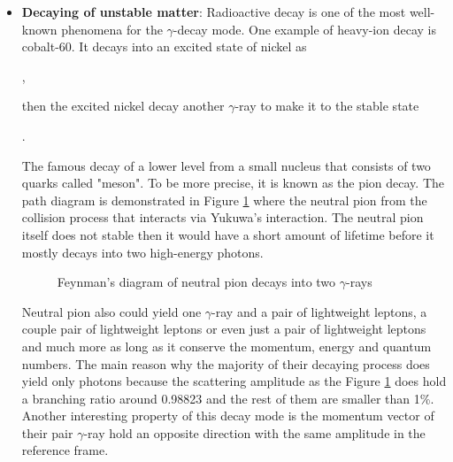 \begin{itemize}
    \item \textbf{Decaying of unstable matter}:
    Radioactive decay is one of the most well-known phenomena for the $\gamma$-decay mode. One example of heavy-ion decay is cobalt-60. It decays 
    into an excited state of nickel as

    ,

    then the excited nickel decay another $\gamma$-ray
    to make it to the stable state

    .

    The famous decay of a lower level from a small nucleus that consists of two quarks called "meson".
    To be more precise, it is known as the pion decay.
    The path diagram is demonstrated in Figure \ref{fig:neutral_pion_decay}
    where the neutral pion from the collision process that interacts
    via Yukuwa's interaction. The neutral pion itself does not stable
    then it would have a short amount of lifetime before it mostly
    decays into two high-energy photons.
    \begin{figure}[h!]
        \centering
        
        \caption{Feynman's diagram of neutral pion decays into two $\gamma$-rays}
        \label{fig:neutral_pion_decay}
    \end{figure}
    Neutral pion also could yield one $\gamma$-ray
    and a pair of lightweight leptons, a couple 
    pair of lightweight leptons or even just a pair 
    of lightweight leptons and much more as long as it 
    conserve the momentum, energy and quantum numbers.
    The main reason why the majority of their decaying process
    does yield only photons because the scattering amplitude
    as the Figure \ref{fig:neutral_pion_decay} does hold a branching
    ratio around 0.98823 and the rest of them are 
    smaller than 1\%. Another interesting property of this 
    decay mode is the momentum vector of their pair $\gamma$-ray
    hold an opposite direction with the same amplitude in the 
    reference frame.


\end{itemize}

